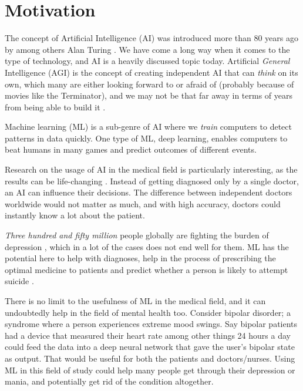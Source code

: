 \section{Motivation}

The concept of Artificial Intelligence (AI) was introduced more than 80 years ago by among others Alan Turing \cite{turing1938}. We have come a long way when it comes to the type of technology, and AI is a heavily discussed topic today. Artificial \textit{General} Intelligence (AGI) is the concept of creating independent AI that can \textit{think} on its own, which many are either looking forward to or afraid of (probably because of movies like the Terminator), and we may not be that far away in terms of years from being able to build it \cite{peter_morgan_2019}. 

Machine learning (ML) is a sub-genre of AI where we \textit{train} computers to detect patterns in data quickly. One type of ML, deep learning, enables computers to beat humans in many games and predict outcomes of different events. 

Research on the usage of AI in the medical field is particularly interesting, as the results can be life-changing \cite{topol2019}. Instead of getting diagnosed only by a single doctor, an AI can influence their decisions. The difference between independent doctors worldwide would not matter as much, and with high accuracy, doctors could instantly know a lot about the patient. 

\emph{Three hundred and fifty million} people globally are fighting the burden of depression \cite{burden_of_depression}, which in a lot of the cases does not end well for them. ML has the potential here to help with diagnoses, help in the process of prescribing the optimal medicine to patients and predict whether a person is likely to attempt suicide \cite{topol2019}. 

There is no limit to the usefulness of ML in the medical field, and it can undoubtedly help in the field of mental health too. Consider bipolar disorder; a syndrome where a person experiences extreme mood swings. Say bipolar patients had a device that measured their heart rate among other things 24 hours a day could feed the data into a deep neural network that gave the user's bipolar state as output. That would be useful for both the patients and doctors/nurses. Using ML in this field of study could help many people get through their depression or mania, and potentially get rid of the condition altogether.

